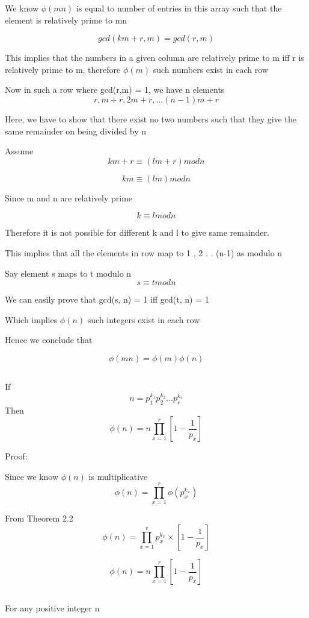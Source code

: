 \documentclass{article}
\begin{document}
We know \(\phi(mn)\) is equal to number of entries in this array such that the \indent element is relatively prime to mn

\[
    gcd(km + r, m) = gcd(r, m)
\]

This implies that the numbers in a given column are relatively prime to m \indent iff r is relatively prime to m, therefore \(\phi(m)\) such numbers exist in each row

Now in such a row where gcd(r,m) = 1, we have n elements
\[
    r , m + r, 2m + r, . . . (n-1)m + r
\]

Here, we have to show that there exist no two numbers such that they give \indent the same remainder on being divided by n

Assume 
\[
    km + r \equiv (lm + r) mod n
\]

\[
    km \equiv (lm) mod n
\]

Since m and n are relatively prime

\[
    k \equiv l mod n
\]

Therefore it is not possible for different k and l to give same remainder. 

This implies that all the elements in row map to 1 , 2 . . (n-1) as modulo n

Say element s maps to t modulo n
\[
    s \equiv t mod n
\]

We can easily prove that gcd(s, n) = 1 iff gcd(t, n) = 1

Which implies \(\phi(n)\) such integers exist in each row

Hence we conclude that

\[
    \phi(mn) = \phi(m) \phi(n)
\]

\subsection{}

If
\[
    n = p_1^{k_1} p_2^{k_2} . . . p_r^{k_r}
\]
Then
\[
    \phi(n) = n \prod_{x = 1}^{r} [1 - \frac{1}{p_x}]
\]

Proof: 

Since we know \(\phi(n)\) is multiplicative
\[
    \phi(n) = \prod_{x=1}^{r} \phi(p_x^{k_x})
\]

From Theorem 2.2 
\[
    \phi(n) = \prod_{x=1}^r p_x^{k_x} \times [1 - \frac{1}{p_x}]
\]

\[
    \phi(n) = n \prod_{x = 1}^{r} [1 - \frac{1}{p_x}]
\]

\subsection{}
For any positive integer n
\end{document}
